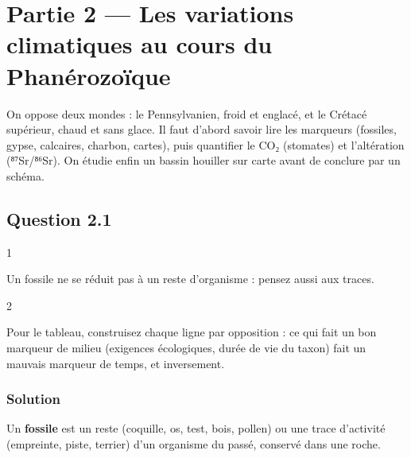 \documentclass[11pt,a4paper]{article}
\begin{document}
\hypertarget{partie-2-les-variations-climatiques-au-cours-du-phanuxe9rozouxefque}{%
\section{Partie 2 --- Les variations climatiques au cours du Phanérozoïque}\label{partie-2-les-variations-climatiques-au-cours-du-phanuxe9rozouxefque}}

On oppose deux mondes : le Pennsylvanien, froid et englacé, et le Crétacé supérieur, chaud et sans glace. Il faut d'abord savoir lire les marqueurs (fossiles, gypse, calcaires, charbon, cartes), puis quantifier le CO₂ (stomates) et l'altération (⁸⁷Sr/⁸⁶Sr). On étudie enfin un bassin houiller sur carte avant de conclure par un schéma.

\hypertarget{question-2.1}{%
\subsection{Question 2.1}\label{question-2.1}}

\begin{indication}{1}

Un fossile ne se réduit pas à un reste d'organisme : pensez aussi aux traces.

\end{indication}

\begin{indication}{2}

Pour le tableau, construisez chaque ligne par opposition : ce qui fait un bon marqueur de milieu (exigences écologiques, durée de vie du taxon) fait un mauvais marqueur de temps, et inversement.

\end{indication}

\hypertarget{solution-11}{%
\subsubsection{Solution}\label{solution-11}}

Un \textbf{fossile} est un reste (coquille, os, test, bois, pollen) ou une trace d'activité (empreinte, piste, terrier) d'un organisme du passé, conservé dans une roche.
\end{document}
